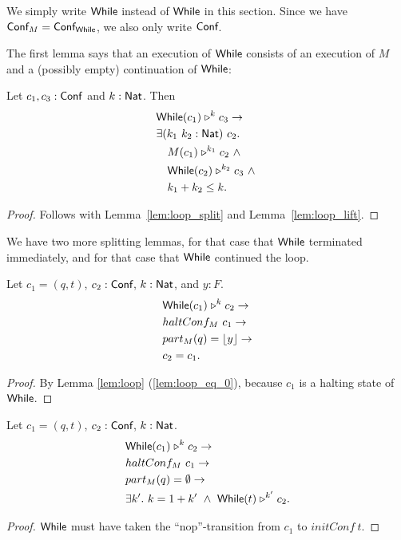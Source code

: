 We simply write $\textsf{While}$ instead of $\textsf{While}$ in this section.  Since we have $\textsf{Conf}_M = \textsf{Conf}_{\textsf{While}}$, we also only write $\textsf{Conf}$.

The first lemma says that an execution of $\textsf{While}$ consists of an execution of $M$ and a (possibly empty) continuation of $\textsf{While}$:
\begin{lemma}
  \label{lem:While_split}
  Let $c_1, c_3 : \textsf{Conf}$ and $k:\textsf{Nat}$.  Then
  \begin{alignat*}{1}
    & \textsf{While}(c_1) \mathrel{\triangleright}^k c_3 \rightarrow \\
    & \exists (k_1~k_2 : \textsf{Nat})~c_2. \\
    & \quad M(c_1) \mathrel{\triangleright}^{k_1} c_2 ~\land~ \\
    & \quad \textsf{While}(c_2) \mathrel{\triangleright}^{k_2} c_3 ~\land~\\
    & \quad k_1 + k_2 \leq k.
  \end{alignat*}
\end{lemma}
\begin{proof}
  Follows with Lemma~\ref{lem:loop_split} and Lemma~\ref{lem:loop_lift}.
\end{proof}

We have two more splitting lemmas, for that case that $\textsf{While}$ terminated immediately, and for that case that $\textsf{While}$ continued the loop.
\begin{lemma}
  \label{lem:While_split_term}
  Let $c_1 = (q, t)$, $c_2 : \textsf{Conf}$, $k:\textsf{Nat}$, and $y:F$.
  \begin{alignat*}{1}
    & \textsf{While}(c_1) \mathrel{\triangleright}^k c_2 \rightarrow \\
    & haltConf_M~c_1 \rightarrow \\
    & part_M(q) = \left\lfloor {y} \right\rfloor \rightarrow \\
    & c_2 = c_1.
  \end{alignat*}
\end{lemma}
\begin{proof}
  By Lemma \ref{lem:loop} (\ref{lem:loop_eq_0}), because $c_1$ is a halting state of $\textsf{While}$.
\end{proof}
\begin{lemma}
  \label{lem:While_split_repeat}
  Let $c_1 = (q, t)$, $c_2 : \textsf{Conf}$, $k:\textsf{Nat}$.
  \begin{alignat*}{1}
    & \textsf{While}(c_1) \mathrel{\triangleright}^k c_2 \rightarrow \\
    & haltConf_M~c_1 \rightarrow \\
    & part_M(q) = \emptyset \rightarrow \\
    & \exists k'.~k = 1+k' ~\land~ \textsf{While}(t) \mathrel{\triangleright}^{k'} c_2.
  \end{alignat*}
\end{lemma}
\begin{proof}
  $\textsf{While}$ must have taken the ``nop''-transition from $c_1$ to $initConf~t$.
\end{proof}

